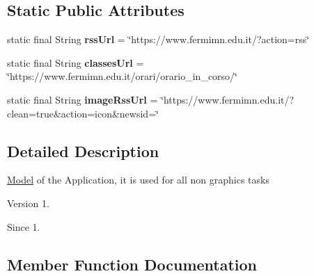 \subsection*{Static Public Attributes}
\begin{DoxyCompactItemize}
\item 
\mbox{\label{classit_1_1diegocastagna_1_1ifermi_1_1_model_a04b99fe55bffe2a4a1c31de91199c437}} 
static final String {\bfseries rss\+Url} = \char`\"{}https\+://www.\+fermimn.\+edu.\+it/?action=rss\char`\"{}
\item 
\mbox{\label{classit_1_1diegocastagna_1_1ifermi_1_1_model_aae72dfb993f0b9a150c428f9b50ab122}} 
static final String {\bfseries classes\+Url} = \char`\"{}https\+://www.\+fermimn.\+edu.\+it/orari/orario\+\_\+in\+\_\+corso/\char`\"{}
\item 
\mbox{\label{classit_1_1diegocastagna_1_1ifermi_1_1_model_ae0c27594125fac2df3d1613dc914a5cd}} 
static final String {\bfseries image\+Rss\+Url} = \char`\"{}https\+://www.\+fermimn.\+edu.\+it/?clean=true\&action=icon\&newsid=\char`\"{}
\end{DoxyCompactItemize}


\subsection{Detailed Description}
\mbox{\hyperlink{classit_1_1diegocastagna_1_1ifermi_1_1_model}{Model}} of the Application, it is used for all non graphics tasks \begin{DoxyVersion}{Version}
1. 
\end{DoxyVersion}
\begin{DoxySince}{Since}
1. 
\end{DoxySince}


\subsection{Member Function Documentation}
\mbox{\label{classit_1_1diegocastagna_1_1ifermi_1_1_model_a282c5d95b08eb1f112fd52e0030bfa43}} 
